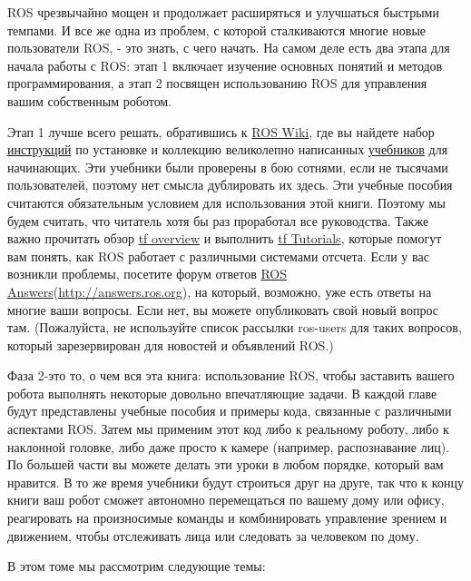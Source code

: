 

ROS чрезвычайно мощен и продолжает расширяться и улучшаться быстрыми темпами. И все же одна из проблем, с которой сталкиваются многие новые пользователи ROS, - это знать, с чего начать. На самом деле есть два этапа для начала работы с ROS: этап 1 включает изучение основных понятий и методов программирования, а этап 2 посвящен использованию ROS для управления вашим собственным роботом.

Этап 1 лучше всего решать, обратившись к \href{http://wiki.ros.org/}{ROS Wiki}, где вы найдете набор \href{http://wiki.ros.org/indigo/Installation}{инструкций} по установке и коллекцию великолепно написанных \href{http://wiki.ros.org/ROS/Tutorials}{учебников} для начинающих. Эти учебники были проверены в бою сотнями, если не тысячами пользователей, поэтому нет смысла дублировать их здесь. Эти учебные пособия считаются обязательным условием для использования этой книги. Поэтому мы будем считать, что читатель хотя бы раз проработал все руководства. Также важно прочитать обзор \href{http://wiki.ros.org/tf}{tf overview} и выполнить \href{http://wiki.ros.org/tf/Tutorials}{tf Tutorials}, которые помогут вам понять, как ROS работает с различными системами отсчета. Если у вас возникли проблемы, посетите форум ответов \href{http://answers.ros.org/}{ROS Answers}(\href{http://answers.ros.org/}{http://answers.ros.org}), на который, возможно, уже есть ответы на многие ваши вопросы. Если нет, вы можете опубликовать свой новый вопрос там. (Пожалуйста, не используйте список рассылки ros-users для таких вопросов, который зарезервирован для новостей и объявлений ROS.)

Фаза 2-это то, о чем вся эта книга: использование ROS, чтобы заставить вашего робота выполнять некоторые довольно впечатляющие задачи. В каждой главе будут представлены учебные пособия и примеры кода, связанные с различными аспектами ROS. Затем мы применим этот код либо к реальному роботу, либо к наклонной головке, либо даже просто к камере (например, распознавание лиц). По большей части вы можете делать эти уроки в любом порядке, который вам нравится. В то же время учебники будут строиться друг на друге, так что к концу книги ваш робот сможет автономно перемещаться по вашему дому или офису, реагировать на произносимые команды и комбинировать управление зрением и движением, чтобы отслеживать лица или следовать за человеком по дому.



В этом томе мы рассмотрим следующие темы:

